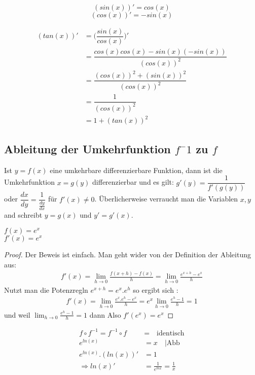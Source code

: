\begin{remark}[Tafelwerk]
\[(sin(x))'=cos(x)\]
\[(cos(x))'= - sin(x)\]
\end{remark}
\begin{example}
\begin{align*}
(tan(x))' &= \bigg( \dfrac{sin(x)}{cos(x)}\bigg)'\\
 &=  \dfrac{cos(x)cos(x)-sin(x)(-sin(x))}{(cos(x))^2}\\
 &=\dfrac{(cos(x))^2+(sin(x))^2}{(cos(x))^2}\\
 &= \dfrac{1}{(cos(x))^2}\\
 &= 1 + (tan(x))^2
\end{align*}
\end{example} 
\subsection{Ableitung der Umkehrfunktion $f^-1$ zu $f$ }
\begin{definition}
Ist $ y = f(x) $ eine umkehrbare differenzierbare Funktion, dann ist die Umkehrfunktion $ x = g(y)$ differenzierbar und es gilt: 
$g'(y)= \dfrac{1}{f'(g(y))}$ oder $\dfrac{dx}{dy}= \dfrac{1}{\frac{dy}{dx}}$ für $f'(x)\neq 0$.
Überlicherweise verraucht man die Variablen $x , y$ and schreibt $y = g(x)$ und $y'=g'(x)$. 
\end{definition}

\begin{example}
$f(x)=e^x$\\
$f'(x)=e^x$\\

\begin{proof}
Der Beweis ist einfach. Man geht wider von der Definition der Ableitung aus:
\begin{align*}
f'(x)= \lim_{h \to 0}{\frac{f(x+h)-f(x)}{h}}= \lim_{h \to 0}{\frac{e^{x+h}-e^x}{h}}
\end{align*}
Nutzt man die Potenzregln $e^{x+h}=e^x.e^h$ so ergibt sich : 
\begin{align*}
f'(x)= \lim_{h \to 0}{\frac{e^x.e^h-e^x}{h}}=e^x \lim_{h \to 0}{\frac{e^h-1}{h}}=1
\end{align*}
und weil $\lim_{h \to 0}{\frac{e^h-1}{h}}=1$ dann Also $f'(e^x)=e^x$
\end{proof}
\end{example}

\begin{remark}
\begin{align*}
f \circ f^{-1} = f^{-1} \circ f &= \quad \text{identisch}\\
e^{ln(x)} &= x \quad | \text{Abb} \\
e^{ln(x)}.(ln(x))' &= 1\\
\Rightarrow ln(x)'&= \frac{1}{e^{lnx}}= \frac{1}{x}
\end{align*}
\end{remark}

